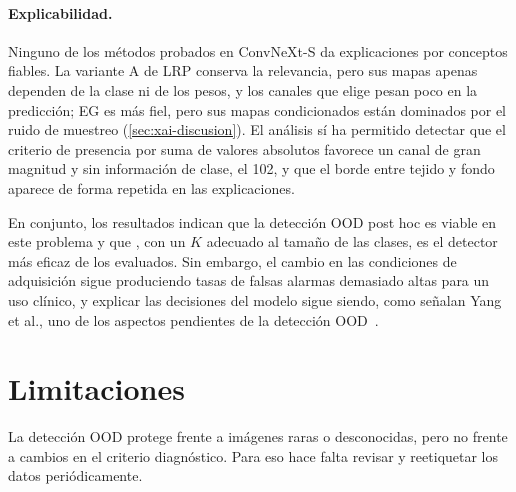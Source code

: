 \paragraph{Explicabilidad.} Ninguno de los métodos probados en ConvNeXt-S da explicaciones por conceptos fiables. La variante A de LRP conserva la relevancia, pero sus mapas apenas dependen de la clase ni de los pesos, y los canales que elige pesan poco en la predicción; EG es más fiel, pero sus mapas condicionados están dominados por el ruido de muestreo (\cref{sec:xai-discusion}). El análisis sí ha permitido detectar que el criterio de presencia por suma de valores absolutos favorece un canal de gran magnitud y sin información de clase, el 102, y que el borde entre tejido y fondo aparece de forma repetida en las explicaciones.

En conjunto, los resultados indican que la detección OOD post hoc es viable en este problema y que \stoodx, con un $K$ adecuado al tamaño de las clases, es el detector más eficaz de los evaluados. Sin embargo, el cambio en las condiciones de adquisición sigue produciendo tasas de falsas alarmas demasiado altas para un uso clínico, y explicar las decisiones del modelo sigue siendo, como señalan Yang et al., uno de los aspectos pendientes de la detección OOD~\cite{yang2024}.

\section{Limitaciones}\label{sec:limitaciones}

La detección OOD protege frente a imágenes raras o desconocidas, pero no frente a cambios en el criterio diagnóstico. Para eso hace falta revisar y reetiquetar los datos periódicamente.


